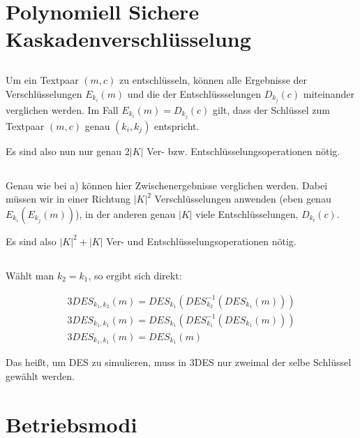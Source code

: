 \documentclass{../crypto}
\date{30. Oktober 2015}
\begin{document}
\maketitle

\section{Polynomiell Sichere Kaskadenverschlüsselung}

\subsection{}
Um ein Textpaar $(m ,c)$ zu entschlüsseln, können alle Ergebnisse der Verschlüsselungen $E_{k_i}(m)$ 
und die der Entschlüssselungen $D_{k_j}(c)$ miteinander verglichen werden. Im Fall $E_{k_i}(m)=D_{k_j}(c)$
gilt, dass der Schlüssel zum Textpaar $(m, c)$ genau $(k_i, k_j)$ entspricht.

Es sind also nun nur genau $2|K|$ Ver- bzw. Entschlüsselungsoperationen nötig.

\subsection{}
Genau wie bei a) können hier Zwischenergebnisse verglichen werden. Dabei müssen wir in einer
Richtung $|K|^2$ Verschlüsselungen anwenden (eben genau $E_{k_i}(E_{k_j}(m))$), in der anderen genau 
$|K|$ viele Entschlüsselungen, $D_{k_l}(c)$.

Es sind also $|K|^2+|K|$ Ver- und Entschlüsselungsoperationen nötig.

\subsection{}
Wählt man $k_2=k_1$, so ergibt sich direkt:

\begin{align*}
    3DES_{k_1,k_2}(m) = DES_{k_1}\left(DES_{k_2}^{-1}\left(DES_{k_1}(m)\right)\right) \\
    3DES_{k_1,k_1}(m) = DES_{k_1}\left(DES_{k_1}^{-1}\left(DES_{k_1}(m)\right)\right) \\
    3DES_{k_1,k_1}(m) = DES_{k_1}\left(m\right)
\end{align*}

Das heißt, um DES zu simulieren, muss in 3DES nur zweimal der selbe Schlüssel gewählt werden.

\section{Betriebsmodi}
\end{document}
